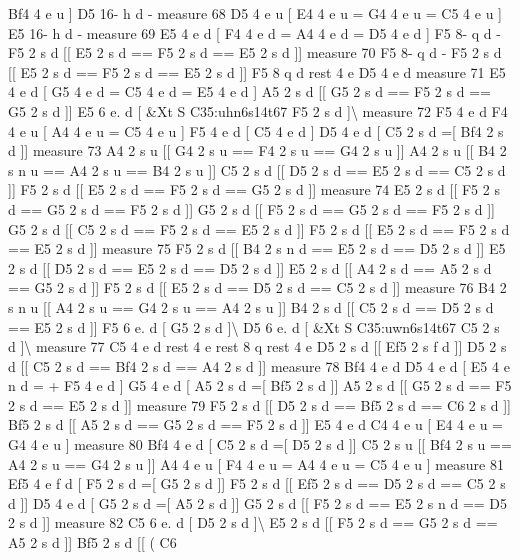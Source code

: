 Bf4 4 e u \mbox{]} D5 16-\/ h d -\/ measure 68 D5 4 e u \mbox{[} E4 4 e u = G4 4 e u = C5 4 e u \mbox{]} E5 16-\/ h d -\/ measure 69 E5 4 e d \mbox{[} F4 4 e d = A4 4 e d = D5 4 e d \mbox{]} F5 8-\/ q d -\/ F5 2 s d \mbox{[}\mbox{[} E5 2 s d == F5 2 s d == E5 2 s d \mbox{]}\mbox{]} measure 70 F5 8-\/ q d -\/ F5 2 s d \mbox{[}\mbox{[} E5 2 s d == F5 2 s d == E5 2 s d \mbox{]}\mbox{]} F5 8 q d rest 4 e D5 4 e d measure 71 E5 4 e d \mbox{[} G5 4 e d = C5 4 e d = E5 4 e d \mbox{]} A5 2 s d \mbox{[}\mbox{[} G5 2 s d == F5 2 s d == G5 2 s d \mbox{]}\mbox{]} E5 6 e. d \mbox{[} \&Xt S C35\+:uhn6s14t67 F5 2 s d \mbox{]}\textbackslash{} measure 72 F5 4 e d F4 4 e u \mbox{[} A4 4 e u = C5 4 e u \mbox{]} F5 4 e d \mbox{[} C5 4 e d \mbox{]} D5 4 e d \mbox{[} C5 2 s d =\mbox{[} Bf4 2 s d \mbox{]}\mbox{]} measure 73 A4 2 s u \mbox{[}\mbox{[} G4 2 s u == F4 2 s u == G4 2 s u \mbox{]}\mbox{]} A4 2 s u \mbox{[}\mbox{[} B4 2 s n u == A4 2 s u == B4 2 s u \mbox{]}\mbox{]} C5 2 s d \mbox{[}\mbox{[} D5 2 s d == E5 2 s d == C5 2 s d \mbox{]}\mbox{]} F5 2 s d \mbox{[}\mbox{[} E5 2 s d == F5 2 s d == G5 2 s d \mbox{]}\mbox{]} measure 74 E5 2 s d \mbox{[}\mbox{[} F5 2 s d == G5 2 s d == F5 2 s d \mbox{]}\mbox{]} G5 2 s d \mbox{[}\mbox{[} F5 2 s d == G5 2 s d == F5 2 s d \mbox{]}\mbox{]} G5 2 s d \mbox{[}\mbox{[} C5 2 s d == F5 2 s d == E5 2 s d \mbox{]}\mbox{]} F5 2 s d \mbox{[}\mbox{[} E5 2 s d == F5 2 s d == E5 2 s d \mbox{]}\mbox{]} measure 75 F5 2 s d \mbox{[}\mbox{[} B4 2 s n d == E5 2 s d == D5 2 s d \mbox{]}\mbox{]} E5 2 s d \mbox{[}\mbox{[} D5 2 s d == E5 2 s d == D5 2 s d \mbox{]}\mbox{]} E5 2 s d \mbox{[}\mbox{[} A4 2 s d == A5 2 s d == G5 2 s d \mbox{]}\mbox{]} F5 2 s d \mbox{[}\mbox{[} E5 2 s d == D5 2 s d == C5 2 s d \mbox{]}\mbox{]} measure 76 B4 2 s n u \mbox{[}\mbox{[} A4 2 s u == G4 2 s u == A4 2 s u \mbox{]}\mbox{]} B4 2 s d \mbox{[}\mbox{[} C5 2 s d == D5 2 s d == E5 2 s d \mbox{]}\mbox{]} F5 6 e. d \mbox{[} G5 2 s d \mbox{]}\textbackslash{} D5 6 e. d \mbox{[} \&Xt S C35\+:uwn6s14t67 C5 2 s d \mbox{]}\textbackslash{} measure 77 C5 4 e d rest 4 e rest 8 q rest 4 e D5 2 s d \mbox{[}\mbox{[} Ef5 2 s f d \mbox{]}\mbox{]} D5 2 s d \mbox{[}\mbox{[} C5 2 s d == Bf4 2 s d == A4 2 s d \mbox{]}\mbox{]} measure 78 Bf4 4 e d D5 4 e d \mbox{[} E5 4 e n d = + F5 4 e d \mbox{]} G5 4 e d \mbox{[} A5 2 s d =\mbox{[} Bf5 2 s d \mbox{]}\mbox{]} A5 2 s d \mbox{[}\mbox{[} G5 2 s d == F5 2 s d == E5 2 s d \mbox{]}\mbox{]} measure 79 F5 2 s d \mbox{[}\mbox{[} D5 2 s d == Bf5 2 s d == C6 2 s d \mbox{]}\mbox{]} Bf5 2 s d \mbox{[}\mbox{[} A5 2 s d == G5 2 s d == F5 2 s d \mbox{]}\mbox{]} E5 4 e d C4 4 e u \mbox{[} E4 4 e u = G4 4 e u \mbox{]} measure 80 Bf4 4 e d \mbox{[} C5 2 s d =\mbox{[} D5 2 s d \mbox{]}\mbox{]} C5 2 s u \mbox{[}\mbox{[} Bf4 2 s u == A4 2 s u == G4 2 s u \mbox{]}\mbox{]} A4 4 e u \mbox{[} F4 4 e u = A4 4 e u = C5 4 e u \mbox{]} measure 81 Ef5 4 e f d \mbox{[} F5 2 s d =\mbox{[} G5 2 s d \mbox{]}\mbox{]} F5 2 s d \mbox{[}\mbox{[} Ef5 2 s d == D5 2 s d == C5 2 s d \mbox{]}\mbox{]} D5 4 e d \mbox{[} G5 2 s d =\mbox{[} A5 2 s d \mbox{]}\mbox{]} G5 2 s d \mbox{[}\mbox{[} F5 2 s d == E5 2 s n d == D5 2 s d \mbox{]}\mbox{]} measure 82 C5 6 e. d \mbox{[} D5 2 s d \mbox{]}\textbackslash{} E5 2 s d \mbox{[}\mbox{[} F5 2 s d == G5 2 s d == A5 2 s d \mbox{]}\mbox{]} Bf5 2 s d \mbox{[}\mbox{[} ( C6 